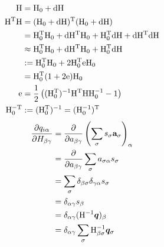 \documentclass[11pt,a4paper,uplatex]{jsarticle}
\begin{document}
\begin{align}
    {\rm H} &= {\rm H_{0} + dH} \\
    {\rm H^{T} H} &= {\rm (H_{0} + dH)^{T} (H_{0} + dH)} \\
    &= {\rm H_{0}^{T} H_{0} + dH^{T} H_{0} + H_{0}^{T}dH + dH^{T}dH} \\
    &\approx {\rm H_{0}^{T} H_{0} + dH^{T} H_{0} + H_{0}^{T}dH } \\
    &:= {\rm H_{0}^{T} H_{0} + 2 H_{0}^{T} e H_{0}} \\
    &= {\rm H_{0}^T (1 + 2 e) H_{0}} \\
{\rm e} &= {\rm \frac{1}{2}\left((H_{0}^{T})^{-1} H^{T} H H_{0}^{-1} - 1 \right) } \\
{\rm H_{0}^{-T} } &:= {\rm (H_{0}^{T})^{-1}} = {\rm (H_{0}^{-1})^{T} }
\end{align}
\begin{align}
    \frac{\partial q_{i \alpha}}{\partial H_{\beta \gamma}} 
    &= \frac{\partial}{\partial a_{\beta \gamma}} \left(\sum_{\sigma} s_{\sigma} \bf{a}_{\sigma} \right)_{\alpha}\\
    &= \frac{\partial}{\partial a_{\beta \gamma}} \sum_{\sigma} a_{\sigma \alpha} s_{\sigma} \\
    &= \sum_{\sigma} \delta_{\beta \sigma} \delta_{\gamma \alpha} s_{\sigma} \\
    &= \delta_{\alpha \gamma} s_{\beta} \\
    &= \delta_{\alpha \gamma} ({\rm H}^{-1} \bm{q})_{\beta} \\
    &= \delta_{\alpha \gamma} \sum_{\sigma} {\rm H}^{-1}_{\beta \sigma} \bm{q}_{\sigma}
\end{align}
\end{document}
